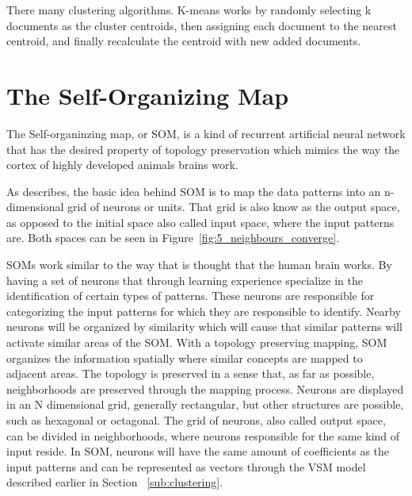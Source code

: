 There many clustering algorithms. K-means works by randomly selecting k documents as the cluster centroids, then assigning each document to the nearest centroid, and finally recalculate the centroid with new added documents. 

\section{The Self-Organizing Map} 
\label{sec:the_self_organizing_map}

The Self-organinzing map, or SOM, is a kind of recurrent artificial neural network that has the desired property of topology preservation which mimics the way the cortex of highly developed animals brains work.

As \citet{Bacao2005} describes, the basic idea behind SOM is to map the data patterns into an n-dimensional grid of neurons or units. That grid is also know as the output space, as opposed to the initial space also called input space, where the input patterns are. Both spaces can be seen in Figure~\ref{fig:5_neighbours_converge}.

SOMs work similar to the way that is thought that the human brain works. By having a set of neurons that through learning experience specialize in the identification of certain types of patterns. These neurons are responsible for categorizing the input patterns for which they are responsible to identify. Nearby neurons will be organized by similarity which will cause that similar patterns will activate similar areas of the SOM.
With a topology preserving mapping, SOM organizes the information spatially where similar concepts are mapped to adjacent areas. The topology is preserved in a sense that, as far as possible, neighborhoods are preserved through the mapping process.
Neurons are displayed in an N dimensional grid, generally rectangular, but other structures are possible, such as hexagonal or octagonal.  The grid of neurons, also called output space, can be divided in neighborhoods, where neurons responsible for the same kind of input reside.
In SOM, neurons will have the same amount of coefficients as the input patterns and can be represented as vectors through the VSM model described earlier in Section ~\ref{sub:clustering}.


